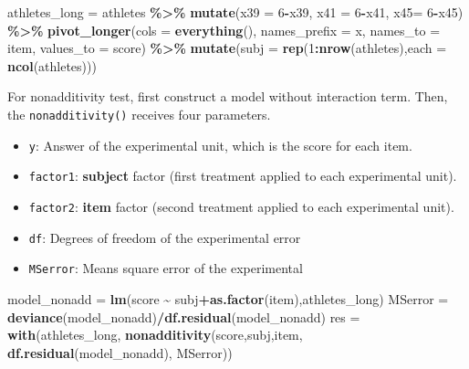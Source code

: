 \documentclass[
]{ctexart}
\newenvironment{Shaded}{\begin{snugshade}}{\end{snugshade}}
\newcommand{\AttributeTok}[1]{\textcolor[rgb]{0.13,0.29,0.53}{#1}}
\newcommand{\DecValTok}[1]{\textcolor[rgb]{0.00,0.00,0.81}{#1}}
\newcommand{\FunctionTok}[1]{\textcolor[rgb]{0.13,0.29,0.53}{\textbf{#1}}}
\newcommand{\NormalTok}[1]{#1}
\newcommand{\OtherTok}[1]{\textcolor[rgb]{0.56,0.35,0.01}{#1}}
\newcommand{\SpecialCharTok}[1]{\textcolor[rgb]{0.81,0.36,0.00}{\textbf{#1}}}
\newcommand{\StringTok}[1]{\textcolor[rgb]{0.31,0.60,0.02}{#1}}
\providecommand{\tightlist}{%
  \setlength{\itemsep}{0pt}\setlength{\parskip}{0pt}}
\begin{document}
\begin{Shaded}
\begin{Highlighting}[]
\NormalTok{athletes\_long }\OtherTok{=}\NormalTok{ athletes }\SpecialCharTok{\%\textgreater{}\%} \FunctionTok{mutate}\NormalTok{(}\AttributeTok{x39 =} \DecValTok{6}\SpecialCharTok{{-}}\NormalTok{x39,}
                       \AttributeTok{x41 =} \DecValTok{6}\SpecialCharTok{{-}}\NormalTok{x41,}
                       \AttributeTok{x45=} \DecValTok{6}\SpecialCharTok{{-}}\NormalTok{x45) }\SpecialCharTok{\%\textgreater{}\%} 
  \FunctionTok{pivot\_longer}\NormalTok{(}\AttributeTok{cols =} \FunctionTok{everything}\NormalTok{(),}
                    \AttributeTok{names\_prefix =} \StringTok{\textquotesingle{}x\textquotesingle{}}\NormalTok{,}
                    \AttributeTok{names\_to =} \StringTok{\textquotesingle{}item\textquotesingle{}}\NormalTok{,}
                    \AttributeTok{values\_to =} \StringTok{\textquotesingle{}score\textquotesingle{}}\NormalTok{) }\SpecialCharTok{\%\textgreater{}\%} 
  \FunctionTok{mutate}\NormalTok{(}\AttributeTok{subj =} \FunctionTok{rep}\NormalTok{(}\DecValTok{1}\SpecialCharTok{:}\FunctionTok{nrow}\NormalTok{(athletes),}\AttributeTok{each =} \FunctionTok{ncol}\NormalTok{(athletes)))}
\end{Highlighting}
\end{Shaded}

For nonadditivity test, first construct a model without interaction
term. Then, the \texttt{nonadditivity()} receives four parameters.

\begin{itemize}
\tightlist
\item
  \texttt{y}: Answer of the experimental unit, which is the score for
  each item.
\item
  \texttt{factor1}: \textbf{subject} factor (first treatment applied to
  each experimental unit).
\item
  \texttt{factor2}: \textbf{item} factor (second treatment applied to
  each experimental unit).
\item
  \texttt{df}: Degrees of freedom of the experimental error
\item
  \texttt{MSerror}: Means square error of the experimental
\end{itemize}

\begin{Shaded}
\begin{Highlighting}[]
\NormalTok{model\_nonadd }\OtherTok{=} \FunctionTok{lm}\NormalTok{(score }\SpecialCharTok{\textasciitilde{}}\NormalTok{ subj}\SpecialCharTok{+}\FunctionTok{as.factor}\NormalTok{(item),athletes\_long)}
\NormalTok{MSerror }\OtherTok{=} \FunctionTok{deviance}\NormalTok{(model\_nonadd)}\SpecialCharTok{/}\FunctionTok{df.residual}\NormalTok{(model\_nonadd)}
\NormalTok{res }\OtherTok{=}  \FunctionTok{with}\NormalTok{(athletes\_long, }\FunctionTok{nonadditivity}\NormalTok{(score,subj,item, }\FunctionTok{df.residual}\NormalTok{(model\_nonadd), MSerror))}
\end{Highlighting}
\end{Shaded}
\end{document}
